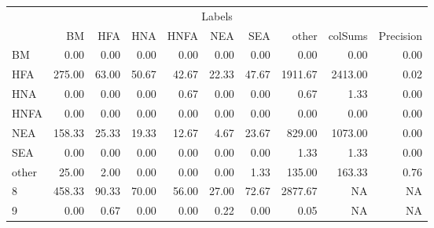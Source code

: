 \begin{table}
\centering\begingroup\fontsize{11}{13}\selectfont

\begin{tabular}{lrrrrrr>{}r|rr}
\toprule
\multicolumn{10}{c}{Labels} \\
\cmidrule(l{3pt}r{3pt}){1-10}
  & BM & HFA & HNA & HNFA & NEA & SEA & other & colSums & Precision\\
\midrule
BM & 0.00 & 0.00 & 0.00 & 0.00 & 0.00 & 0.00 & 0.00 & 0.00 & 0.00\\
HFA & 275.00 & 63.00 & 50.67 & 42.67 & 22.33 & 47.67 & 1911.67 & 2413.00 & 0.02\\
HNA & 0.00 & 0.00 & 0.00 & 0.67 & 0.00 & 0.00 & 0.67 & 1.33 & 0.00\\
HNFA & 0.00 & 0.00 & 0.00 & 0.00 & 0.00 & 0.00 & 0.00 & 0.00 & 0.00\\
NEA & 158.33 & 25.33 & 19.33 & 12.67 & 4.67 & 23.67 & 829.00 & 1073.00 & 0.00\\
\addlinespace
SEA & 0.00 & 0.00 & 0.00 & 0.00 & 0.00 & 0.00 & 1.33 & 1.33 & 0.00\\
other & 25.00 & 2.00 & 0.00 & 0.00 & 0.00 & 1.33 & 135.00 & 163.33 & 0.76\\
8 & 458.33 & 90.33 & 70.00 & 56.00 & 27.00 & 72.67 & 2877.67 & NA & NA\\
9 & 0.00 & 0.67 & 0.00 & 0.00 & 0.22 & 0.00 & 0.05 & NA & NA\\
\bottomrule
\end{tabular}
\endgroup{}
\end{table}
